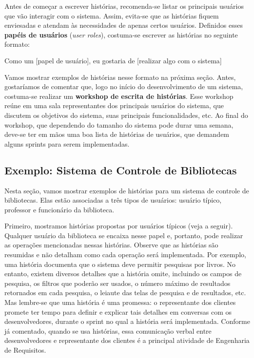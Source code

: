\documentclass[
  11pt,
  twoside]{book}
\renewenvironment{quote}{\centering \vspace{1.5ex} \begin{tcolorbox}[colback=backcolor, width=4.9in]}{\end{tcolorbox}}
\begin{document}
Antes de começar a escrever histórias, recomenda-se listar os principais
usuários que vão interagir com o sistema. Assim, evita-se que as
histórias fiquem enviesadas e atendam às necessidades de apenas certos
usuários. Definidos esses \textbf{papéis de usuários} (\emph{user
roles}), costuma-se escrever as histórias no seguinte formato:

\begin{quote}
Como um {[}papel de usuário{]}, eu gostaria de {[}realizar algo com o
sistema{]}
\end{quote}

 Vamos mostrar exemplos
de histórias nesse formato na próxima seção. Antes, gostaríamos de
comentar que, logo no início do desenvolvimento de um sistema,
costuma-se realizar um \textbf{workshop de escrita de histórias}. Esse
workshop reúne em uma sala representantes dos principais usuários do
sistema, que discutem os objetivos do sistema, suas principais
funcionalidades, etc. Ao final do workshop, que dependendo do tamanho do
sistema pode durar uma semana, deve-se ter em mãos uma boa lista de
histórias de usuários, que demandem alguns sprints para serem
implementadas.

\hypertarget{exemplo-sistema-de-controle-de-bibliotecas}{%
\subsection{Exemplo: Sistema de Controle de
Bibliotecas}\label{exemplo-sistema-de-controle-de-bibliotecas}}

Nesta seção, vamos mostrar exemplos de histórias para um sistema de
controle de bibliotecas. Elas estão associadas a três tipos de usuários:
usuário típico, professor e funcionário da biblioteca.

Primeiro, mostramos histórias propostas por usuários típicos (veja a
seguir). Qualquer usuário da biblioteca se encaixa nesse papel e,
portanto, pode realizar as operações mencionadas nessas histórias.
Observe que as histórias são resumidas e não detalham como cada operação
será implementada. Por exemplo, uma história documenta que o sistema
deve permitir pesquisas por livros. No entanto, existem diversos
detalhes que a história omite, incluindo os campos de pesquisa, os
filtros que poderão ser usados, o número máximo de resultados retornados
em cada pesquisa, o leiaute das telas de pesquisa e de resultados, etc.
Mas lembre-se que uma história é uma promessa: o representante dos
clientes promete ter tempo para definir e explicar tais detalhes em
conversas com os desenvolvedores, durante o sprint no qual a história
será implementada. Conforme já comentado, quando se usa histórias, essa
comunicação verbal entre desenvolvedores e representante dos clientes é
a principal atividade de Engenharia de Requisitos.
\end{document}
